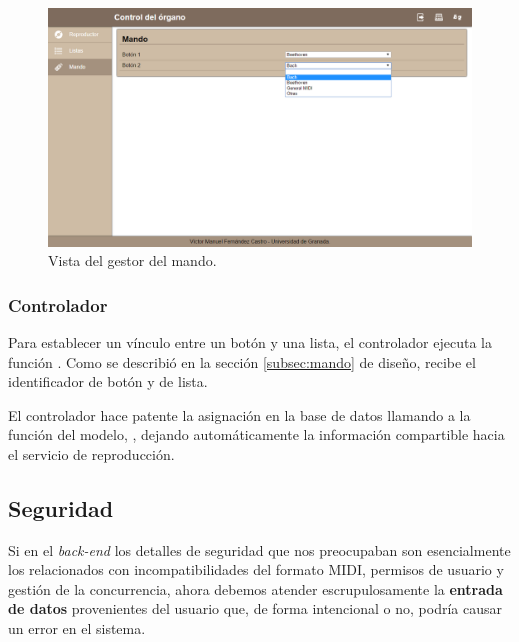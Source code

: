 \smallskip

\begin{figure}[H]
	\noindent \begin{centering}
		\includegraphics[width=\linewidth*3/4]{capitulo5/cap_mando}
		\par\end{centering}
	\smallskip
	\caption{\label{fig:cap_mando} Vista del gestor del mando.}
\end{figure} 

\smallskip

\subsubsection{Controlador}

Para establecer un vínculo entre un botón y una lista, el controlador ejecuta la función . Como se describió en la sección \ref{subsec:mando} de diseño, recibe el identificador de botón y de lista.

El controlador hace patente la asignación en la base de datos llamando a la función del modelo, , dejando automáticamente la información compartible hacia el servicio de reproducción.

\subsection{Seguridad}
\label{subsec:web_seguridad}

Si en el \textit{back-end} los detalles de seguridad que nos preocupaban son esencialmente los relacionados con incompatibilidades del formato \acrshort{MIDI}, permisos de usuario y gestión de la concurrencia, ahora debemos atender escrupulosamente la \textbf{entrada de datos} provenientes del usuario que, de forma intencional o no, podría causar un error en el sistema.

